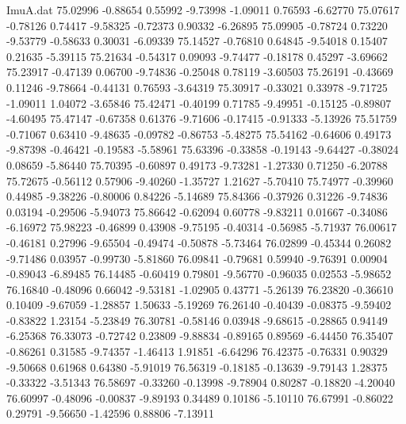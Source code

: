 \begin{filecontents}{ImuA.dat}
  75.02996   -0.88654    0.55992   -9.73998   -1.09011    0.76593   -6.62770
  75.07617   -0.78126    0.74417   -9.58325   -0.72373    0.90332   -6.26895
  75.09905   -0.78724    0.73220   -9.53779   -0.58633    0.30031   -6.09339
  75.14527   -0.76810    0.64845   -9.54018    0.15407    0.21635   -5.39115
  75.21634   -0.54317    0.09093   -9.74477   -0.18178    0.45297   -3.69662
  75.23917   -0.47139    0.06700   -9.74836   -0.25048    0.78119   -3.60503
  75.26191   -0.43669    0.11246   -9.78664   -0.44131    0.76593   -3.64319
  75.30917   -0.33021    0.33978   -9.71725   -1.09011    1.04072   -3.65846
  75.42471   -0.40199    0.71785   -9.49951   -0.15125   -0.89807   -4.60495
  75.47147   -0.67358    0.61376   -9.71606   -0.17415   -0.91333   -5.13926
  75.51759   -0.71067    0.63410   -9.48635   -0.09782   -0.86753   -5.48275
  75.54162   -0.64606    0.49173   -9.87398   -0.46421   -0.19583   -5.58961
  75.63396   -0.33858   -0.19143   -9.64427   -0.38024    0.08659   -5.86440
  75.70395   -0.60897    0.49173   -9.73281   -1.27330    0.71250   -6.20788
  75.72675   -0.56112    0.57906   -9.40260   -1.35727    1.21627   -5.70410
  75.74977   -0.39960    0.44985   -9.38226   -0.80006    0.84226   -5.14689
  75.84366   -0.37926    0.31226   -9.74836    0.03194   -0.29506   -5.94073
  75.86642   -0.62094    0.60778   -9.83211    0.01667   -0.34086   -6.16972
  75.98223   -0.46899    0.43908   -9.75195   -0.40314   -0.56985   -5.71937
  76.00617   -0.46181    0.27996   -9.65504   -0.49474   -0.50878   -5.73464
  76.02899   -0.45344    0.26082   -9.71486    0.03957   -0.99730   -5.81860
  76.09841   -0.79681    0.59940   -9.76391    0.00904   -0.89043   -6.89485
  76.14485   -0.60419    0.79801   -9.56770   -0.96035    0.02553   -5.98652
  76.16840   -0.48096    0.66042   -9.53181   -1.02905    0.43771   -5.26139
  76.23820   -0.36610    0.10409   -9.67059   -1.28857    1.50633   -5.19269
  76.26140   -0.40439   -0.08375   -9.59402   -0.83822    1.23154   -5.23849
  76.30781   -0.58146    0.03948   -9.68615   -0.28865    0.94149   -6.25368
  76.33073   -0.72742    0.23809   -9.88834   -0.89165    0.89569   -6.44450
  76.35407   -0.86261    0.31585   -9.74357   -1.46413    1.91851   -6.64296
  76.42375   -0.76331    0.90329   -9.50668    0.61968    0.64380   -5.91019
  76.56319   -0.18185   -0.13639   -9.79143    1.28375   -0.33322   -3.51343
  76.58697   -0.33260   -0.13998   -9.78904    0.80287   -0.18820   -4.20040
  76.60997   -0.48096   -0.00837   -9.89193    0.34489    0.10186   -5.10110
  76.67991   -0.86022    0.29791   -9.56650   -1.42596    0.88806   -7.13911

\end{filecontents}
